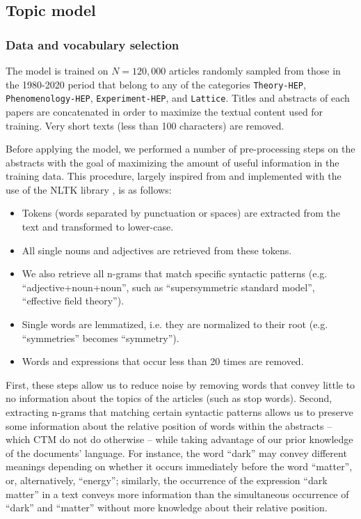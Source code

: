 \documentclass[smallextended]{svjour3}
\begin{document}
\subsection{Topic model}


\subsubsection{\label{appendix:data_selection}Data and vocabulary selection}

The model is trained on $N=120,000$ articles randomly sampled from those in the 1980-2020 period that belong to any of the categories \texttt{Theory-HEP}, \texttt{Phenomenology-HEP}, \texttt{Experiment-HEP}, and \texttt{Lattice}. Titles and abstracts of each papers are concatenated in order to maximize the textual content used for training. Very short texts (less than 100 characters) are removed.

Before applying the model, we performed a number of pre-processing steps on the abstracts with the goal of maximizing the amount of useful information in the training data. This procedure, largely inspired from \citealt{omodei_tel-01097702} and implemented with the use of the NLTK library \citep{nltk}, is as follows:

\begin{itemize}
    \item Tokens (words separated by punctuation or spaces) are extracted from the text and transformed to lower-case.
    \item All single nouns and adjectives are retrieved from these tokens.
    \item We also retrieve all n-grams that match specific syntactic patterns (e.g. ``adjective+noun+noun'', such as ``supersymmetric standard model'', ``effective field theory'').
    \item Single words are lemmatized, i.e. they are normalized to their root (e.g. ``symmetries'' becomes ``symmetry'').
    \item Words and expressions that occur less than 20 times are removed.
\end{itemize}

First, these steps allow us to reduce noise by removing words that convey little to no information about the topics of the articles (such as stop words). Second, extracting n-grams that matching certain syntactic patterns allows us to preserve some information about the relative position of words within the abstracts -- which CTM do not do otherwise -- while taking advantage of our prior knowledge of the documents' language. For instance, the word ``dark'' may convey different meanings depending on whether it occurs immediately before the word ``matter'', or, alternatively, ``energy''; similarly, the occurrence of the expression ``dark matter'' in a text conveys more information than the simultaneous occurrence of ``dark'' and ``matter'' without more knowledge about their relative position.
\end{document}
